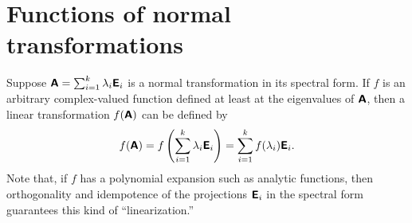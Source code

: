 \section{Functions of normal transformations}

Suppose $\textsf{\textbf{A}}=\sum_{i=1}^k \lambda_i  \textsf{\textbf{E}}_i $ is a normal transformation
in its spectral form.
If $f$ is an arbitrary complex-valued function defined at least at the eigenvalues of $\textsf{\textbf{A}}$,
then a linear transformation  $f(\textsf{\textbf{A}})$ can be defined by
\begin{equation}
f(\textsf{\textbf{A}})=
f\left(\sum_{i=1}^k \lambda_i \textsf{\textbf{E}}_i\right)
=\sum_{i=1}^k f(\lambda_i)  \textsf{\textbf{E}}_i
 .
\end{equation}
Note that, if $f$ has a polynomial expansion such as analytic functions, then orthogonality and idempotence
of the projections $\textsf{\textbf{E}}_i $ in the spectral form guarantees this kind of ``linearization.''

